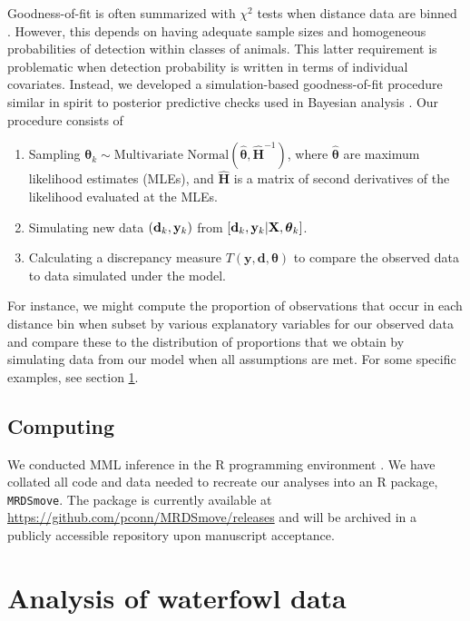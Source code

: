 \documentclass[aoas,preprint]{imsart}
\numberwithin{equation}{section}
\theoremstyle{plain}
\begin{document}
Goodness-of-fit is often summarized with $\chi^2$ tests when distance data are binned \citep{BurnhamEtAl2004}.  However, this depends on having adequate sample sizes and homogeneous probabilities of detection within classes of animals. This latter requirement is problematic when detection probability is written in terms of individual covariates.  Instead, we developed a simulation-based goodness-of-fit procedure similar in spirit to posterior predictive checks used in Bayesian analysis \citep[e.g.][]{GelmanEtAl2014}.  Our procedure consists of
\begin{enumerate}
  \item Sampling $\boldsymbol{\theta}_k \sim \text{Multivariate Normal}(\hat{\boldsymbol{\theta}},\hat{\textbf{H}}^{-1})$, where $\hat{\boldsymbol{\theta}}$ are maximum likelihood estimates (MLEs), and $\hat{\textbf{H}}$ is a matrix of second derivatives of the likelihood evaluated at the MLEs.
  \item Simulating new data $({\bf d}_k, {\bf y}_k)$ from $[{\bf d}_k,{\bf y}_k | {\bf X},\boldsymbol{\theta}_k]$.
  \item Calculating a discrepancy measure $T(\textbf{y},\textbf{d},\boldsymbol{\theta})$ to compare the observed data to data simulated under the model.
\end{enumerate}
For instance, we might compute the proportion of observations that occur in each distance bin when subset by various explanatory variables for our observed data and compare these to the distribution of proportions that we obtain by simulating data from our model when all assumptions are met.  For some specific examples, see section \ref{sec:data}.

\subsection{Computing}

We conducted MML inference in the R programming environment \citep{RTeam2016}.  We have collated all code and data needed to recreate our analyses into an R package, \texttt{MRDSmove}. The package is currently available at \url{https://github.com/pconn/MRDSmove/releases} and will be archived in a publicly accessible repository upon manuscript acceptance.

\section{Analysis of waterfowl data} \label{sec:data}
\end{document}
